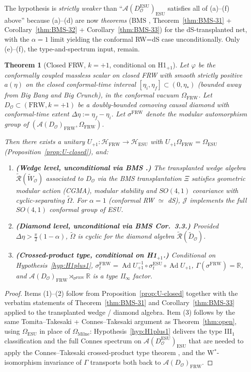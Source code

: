 \documentclass[11pt]{article}
\newtheorem{theorem}{Theorem}
\theoremstyle{definition}
\newcommand{\R}{\mathbb{R}}
\newcommand{\HH}{\mathcal{H}}
\renewcommand{\AA}{\mathcal{A}}
\newcommand{\OO}{\mathcal{O}}
\newcommand{\Ad}{\operatorname{Ad}}
\newcommand{\FRW}{\mathrm{FRW}}
\newcommand{\ESU}{\mathrm{ESU}}
\newcommand{\Milne}{\mathrm{Milne}}
\begin{document}
The hypothesis is \emph{strictly weaker} than ``$\AA(D_\OO^\ESU)_\ESU$
satisfies all of (a)--(f) above'' because (a)--(d) are now \emph{theorems}
(BMS \cite{BMS2000}, Theorem~\ref{thm:BMS-31} + Corollary~\ref{thm:BMS-32}
+ Corollary~\ref{thm:BMS-33}) for the dS-transplanted net, with the $\alpha=1$
limit yielding the conformal RW=dS case unconditionally. Only (e)--(f),
the type-and-spectrum input, remain.

\begin{theorem}[Closed FRW, $k=+1$, conditional on H1$_{+1}$]\label{thm:closed}
Let $\varphi$ be the conformally coupled massless scalar on closed FRW with
smooth strictly positive $a(\eta)$ on the closed conformal-time interval
$[\eta_i,\eta_f]\subset(0,\eta_*)$ (bounded away from Big Bang and Big
Crunch), in the conformal vacuum $\Omega_\FRW$. Let $D_\OO\subset
(\FRW,k=+1)$ be a doubly-bounded comoving causal diamond with conformal-time
extent $\Delta\eta:=\eta_f-\eta_i$. Let $\sigma^\FRW$ denote the modular
automorphism group of $(\AA(D_\OO)_\FRW,\Omega_\FRW)$.

Then there exists a unitary $U_{+1}:\HH_\FRW\to\HH_\ESU$ with
$U_{+1}\Omega_\FRW=\Omega_\ESU$ (Proposition~\ref{prop:U-closed}), and:
\begin{enumerate}
\item \textbf{(Wedge level, unconditional via BMS \cite{BMS2000}.)} The
transplanted wedge algebra $\widetilde{\mathcal R}(\widetilde W_\OO)$
associated to $D_\OO$ via the BMS transplantation $\Xi$ satisfies
geometric modular action (CGMA), modular stability and $SO(4,1)$
covariance with cyclic-separating $\widetilde\Omega$. For $\alpha=1$
(conformal RW $\simeq$ dS), $\mathcal J$ implements the full
$SO(4,1)$ conformal group of ESU.
\item \textbf{(Diamond level, unconditional via BMS Cor.~3.3.)} Provided
$\Delta\eta>\frac{\pi}{2}(1-\alpha)$, $\widetilde\Omega$ is cyclic for
the diamond algebra $\widetilde{\mathcal R}(\widetilde D_\OO)$.
\item \textbf{(Crossed-product type, conditional on H1$_{+1}$.)} Conditional
on Hypothesis~\ref{hyp:H1plus1},
$\sigma^\FRW_t=\Ad U_{+1}^{-1}\circ\sigma^\ESU_t\circ\Ad U_{+1}$,
$\Gamma(\sigma^\FRW)=\R$, and $\AA(D_\OO)_\FRW\rtimes_{\sigma^\FRW}\R$ is a
type II$_\infty$ factor.
\end{enumerate}
\end{theorem}

\begin{proof}
Items (1)--(2) follow from Proposition~\ref{prop:U-closed} together with the
verbatim statements of Theorem~\ref{thm:BMS-31} and Corollary~\ref{thm:BMS-33}
applied to the transplanted wedge / diamond algebra. Item (3) follows by
the same Tomita--Takesaki + Connes--Takesaki argument as
Theorem~\ref{thm:open}, using $\Omega_\ESU$ in place of $\Omega_\Milne$:
Hypothesis~\ref{hyp:H1plus1} delivers the type III$_1$ classification and
the full Connes spectrum on $\AA(D_\OO^\ESU)_\ESU$ that are needed to apply
the Connes--Takesaki crossed-product type theorem
\cite{Connes1973, CLPW2023}, and the W$^*$-isomorphism invariance of
$\Gamma$ \cite[Prop.~3.4]{Remondiere2026} transports both back to $\AA(D_\OO)_\FRW$.
\end{proof}
\end{document}
